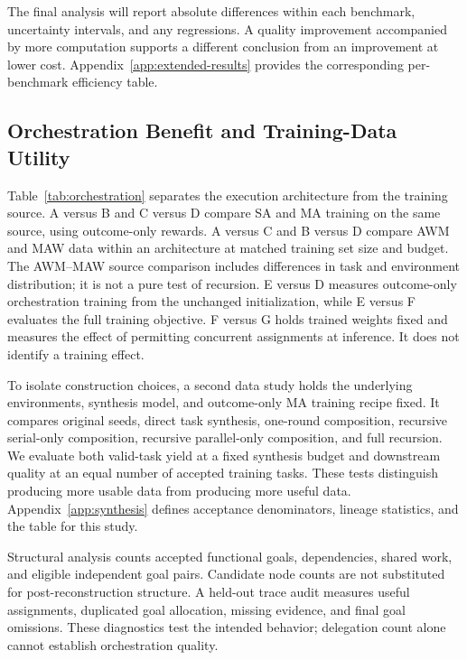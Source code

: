 The final analysis will report absolute differences within each benchmark, uncertainty intervals, and any regressions. A quality improvement accompanied by more computation supports a different conclusion from an improvement at lower cost. Appendix~\ref{app:extended-results} provides the corresponding per-benchmark efficiency table. 

\subsection{Orchestration Benefit and Training-Data Utility}
\label{sec:orchestration-experiments}

Table~\ref{tab:orchestration} separates the execution architecture from the training source. A versus B and C versus D compare SA and MA training on the same source, using outcome-only rewards. A versus C and B versus D compare AWM and MAW data within an architecture at matched training set size and budget. The AWM--MAW source comparison includes differences in task and environment distribution; it is not a pure test of recursion. E versus D measures outcome-only orchestration training from the unchanged initialization, while E versus F evaluates the full training objective. F versus G holds trained weights fixed and measures the effect of permitting concurrent assignments at inference. It does not identify a training effect.



To isolate construction choices, a second data study holds the underlying environments, synthesis model, and outcome-only MA training recipe fixed. It compares original seeds, direct task synthesis, one-round composition, recursive serial-only composition, recursive parallel-only composition, and full recursion. We evaluate both valid-task yield at a fixed synthesis budget and downstream quality at an equal number of accepted training tasks. These tests distinguish producing more usable data from producing more useful data. Appendix~\ref{app:synthesis} defines acceptance denominators, lineage statistics, and the table for this study.

Structural analysis counts accepted functional goals, dependencies, shared work, and eligible independent goal pairs. Candidate node counts are not substituted for post-reconstruction structure. A held-out trace audit measures useful assignments, duplicated goal allocation, missing evidence, and final goal omissions. These diagnostics test the intended behavior; delegation count alone cannot establish orchestration quality. 

